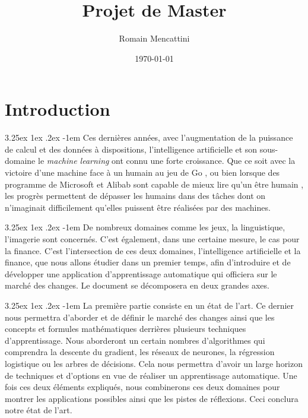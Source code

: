 \documentclass[a4paper, 11pt]{article}
\title{Projet de Master}
\author{Romain Mencattini}
\date{\today}
\makeatletter
\renewcommand\paragraph{\@startsection{paragraph}{5}{\z@}%
  {3.25ex \@plus1ex \@minus.2ex}%
  {-1em}%
  {\normalfont\normalsize\bfseries}}
\makeatother
\begin{document}
\maketitle
\newpage
\tableofcontents
\newpage

\section{Introduction}
\paragraph{}
Ces dernières années, avec l'augmentation de la puissance de calcul et des données à dispositions, l'intelligence artificielle et son sous-domaine le \textit{machine learning} ont connu une forte croissance. Que ce soit avec la victoire d'une machine face à un humain au jeu de Go \cite{deepmind}, ou bien lorsque des programme de Microsoft et Alibab sont capable de mieux lire qu'un être humain \cite{microsoft_reading}, les progrès permettent de dépasser les humains dans des tâches dont on n'imaginait difficilement qu'elles puissent être réalisées par des machines.

\paragraph{}
De nombreux domaines comme les jeux, la linguistique, l'imagerie sont concernés. C'est également, dans une certaine mesure, le cas pour la finance.
C'est l'intersection de ces deux domaines, l'intelligence artificielle et la finance, que nous allons étudier dans un premier temps, afin d'introduire et de développer une application d'apprentissage automatique qui officiera sur le marché des changes.
Le document se décomposera en deux grandes axes. 

\paragraph{}
La première partie consiste en un état de l'art. Ce dernier nous permettra d'aborder et de définir le marché des changes ainsi que les concepts et formules mathématiques derrières plusieurs techniques d'apprentissage. Nous aborderont un certain nombres d'algorithmes qui comprendra la descente du gradient, les réseaux de neurones, la régression logistique ou les arbres de décisions. Cela nous permettra d'avoir un large horizon de techniques et d'options en vue de réaliser un apprentissage automatique. Une fois ces deux éléments expliqués, nous combinerons ces deux domaines pour montrer les applications possibles ainsi que les pistes de réflexions. Ceci conclura notre état de l'art.
\end{document}
